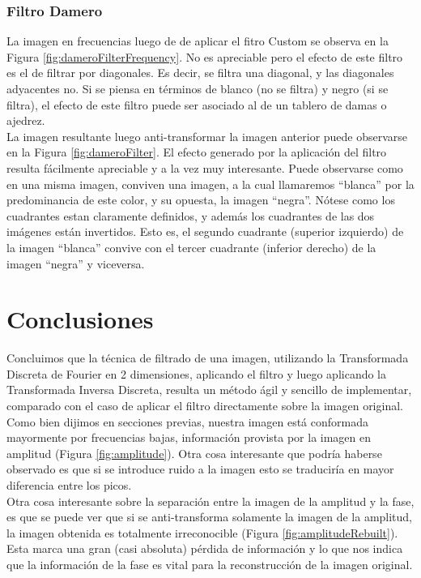 \documentclass[twocolumn,a4paper,10pt]{article}
\begin{document}
\subsubsection{Filtro Damero}

La imagen en frecuencias luego de de aplicar el fitro Custom se observa en la Figura \ref{fig:dameroFilterFrequency}. No es apreciable pero el efecto de este 
filtro es el de filtrar por diagonales. Es decir, se filtra una diagonal, y las diagonales adyacentes no. Si se piensa en t\'erminos de blanco (no se filtra) y 
negro (si se filtra), el efecto de este filtro puede ser asociado al de un tablero de damas o ajedrez.\\

La imagen resultante luego anti-transformar la imagen anterior puede observarse en la Figura \ref{fig:dameroFilter}. El efecto generado por la aplicaci\'on del 
filtro resulta f\'acilmente apreciable y a la vez muy interesante. Puede observarse como en una misma imagen, conviven una imagen, a la cual llamaremos ``blanca''
por la predominancia de este color, y su opuesta, la imagen ``negra''. 
N\'otese como los cuadrantes estan claramente definidos, y además los cuadrantes de las dos im\'agenes est\'an invertidos. Esto es, el 
segundo cuadrante (superior izquierdo) de la imagen ``blanca'' convive con el tercer cuadrante (inferior derecho) de la imagen ``negra'' y viceversa. 

\section{Conclusiones}
\label{sec:conclusiones}

Concluimos que la t\'ecnica de filtrado de una imagen, utilizando la Transformada Discreta de Fourier en 2 dimensiones, aplicando el filtro y luego aplicando la
Transformada Inversa Discreta, resulta un m\'etodo \'agil y sencillo de implementar, comparado con el caso de aplicar el filtro directamente sobre la imagen 
original. \\

Como bien dijimos en secciones previas, nuestra imagen está conformada mayormente por frecuencias bajas, informaci\'on provista por la imagen en amplitud 
(Figura \ref{fig:amplitude}). Otra cosa interesante que podría haberse observado es que si se introduce ruido a la imagen esto se traducir\'ia en mayor 
diferencia entre los picos\cite{HIPR2-FourierTransform}. \\

Otra cosa interesante sobre la separaci\'on entre la imagen de la amplitud y la fase, es que se puede ver que si se anti-transforma solamente la imagen de la 
amplitud, la imagen obtenida es totalmente irreconocible (Figura \ref{fig:amplitudeRebuilt}). Esta marca una gran (casi absoluta) p\'erdida de informaci\'on y lo que nos indica que la informaci\'on
de la fase es vital para la reconstrucci\'on de la imagen original.\\
\end{document}
